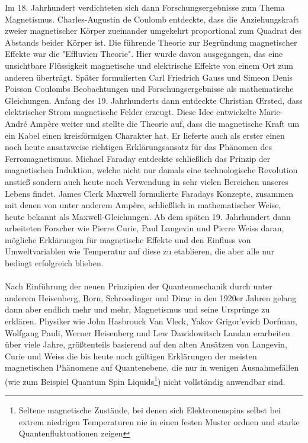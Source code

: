 \documentclass[12pt, a4paper]{article}
\begin{document}
	Im 18. Jahrhundert verdichteten sich dann Forschungsergebnisse zum Thema Magnetismus. Charles-Augustin de Coulomb entdeckte, dass die Anziehungskraft zweier magnetischer Körper zueinander umgekehrt proportional zum Quadrat des Abstands beider Körper ist\cite{metioui22}.\newline
	Die führende Theorie zur Begründung magnetischer Effekte war die "{Effluvien Theorie}". Hier wurde davon ausgegangen, das eine unsichtbare Flüssigkeit magnetische und elektrische Effekte von einem Ort zum anderen überträgt\cite{singh19}.\newline
	Später formulierten Carl Friedrich Gauss und Simeon Denis Poisson Coulombs Beobachtungen und Forschungsergebnisse als mathematische Gleichungen. Anfang des 19. Jahrhunderts dann entdeckte Christian Œrsted, dass elektrischer Strom magnetische Felder erzeugt. Diese Idee entwickelte Marie-André Ampère weiter und stellte die Theorie auf, dass die magnetische Kraft um ein Kabel einen kreisförmigen Charakter hat. Er lieferte auch als erster einen noch heute ansatzweise richtigen Erklärungsansatz für das Phänomen des Ferromagnetismus\cite{singh19}.\newline 
	Michael Faraday entdeckte schließlich das Prinzip der magnetischen Induktion, welche nicht nur damals eine technologische Revolution anstieß\cite{singh19} sondern auch heute noch Verwendung in sehr vielen Bereichen unseres Lebens findet.\newline 
	James Clerk Maxwell formulierte Faradays Konzepte, zusammen mit denen von unter anderem Ampère, schließlich in mathematischer Weise\cite{singh19}, heute bekannt als Maxwell-Gleichungen.\newline 
	Ab dem späten 19. Jahrhundert dann arbeiteten Forscher wie Pierre Curie, Paul Langevin und Pierre Weiss daran, mögliche Erklärungen für magnetische Effekte und den Einfluss von Umweltvariablen wie Temperatur auf diese zu etablieren, die aber alle nur bedingt erfolgreich blieben\cite{singh19}.\paragraph{}
	
	Nach Einführung der neuen Prinzipien der Quantenmechanik durch unter anderem Heisenberg, Born, Schroedinger und Dirac in den 1920er Jahren gelang dann aber endlich mehr und mehr, Magnetismus und seine Ursprünge zu erklären.\newline
	Physiker wie John Hasbrouck Van Vleck, Yakov Grigor’evich Dorfman, Wolfgang Pauli, Werner Heisenberg und Lew Dawidowitsch Landau erarbeiten über viele Jahre, größtenteils basierend auf den alten Ansätzen von Langevin, Curie und Weiss die bis heute noch gültigen Erklärungen der meisten magnetischen Phänomene auf Quantenebene, die nur in wenigen Ausnahmefällen (wie zum Beispiel Quantum Spin Liquids\footnote{Seltene magnetische Zustände, bei denen sich Elektronenspins selbst bei extrem niedrigen Temperaturen nie in einen festen Muster ordnen und starke Quantenfluktuationen zeigen}) nicht vollständig anwendbar sind\cite{singh19}.\newline 
		
\end{document}
